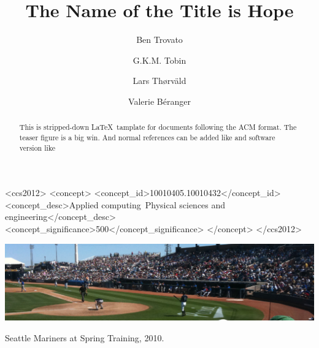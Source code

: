\documentclass[10pt,sigconf,screen,authorversion,review,anonymous]{acmart}
\begin{document}
\title[A short title]{The Name of the Title is Hope}


\author{Ben Trovato}
\author{G.K.M. Tobin}
\authornotemark[1]

\author{Lars Th{\o}rv{\"a}ld}

\author{Valerie B\'eranger}

\renewcommand{\shortauthors}{Trovato and Tobin, et al.}


\begin{abstract}
  This is stripped-down \LaTeX\ tamplate for documents following the ACM format. The teaser figure is a big win. And normal references can be added like \cite{Abril07} and software version like \cite{delebecque:hal-02090402-condensed}
\end{abstract}


\begin{CCSXML}
<ccs2012>
   <concept>
       <concept_id>10010405.10010432</concept_id>
       <concept_desc>Applied computing~Physical sciences and engineering</concept_desc>
       <concept_significance>500</concept_significance>
       </concept>
 </ccs2012>
\end{CCSXML}



\begin{teaserfigure}
  \includegraphics[width=\textwidth]{sampleteaser}
  \caption{Seattle Mariners at Spring Training, 2010.}
  \label{fig:teaser}
\end{teaserfigure}
\end{document}
